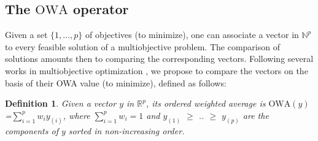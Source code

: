 \documentclass[final,3p,times]{elsarticle}
\newcommand{\owa}{\mbox{OWA}}
\newtheorem{defi}{Definition}
\begin{document}
\subsection{The $\owa$ operator}
\label{sec:def}

Given a set $\{1,\ldots,p\}$ of objectives (to minimize), one can associate a vector in ${\mathbb N}^p$ to every feasible solution of a multiobjective problem. The comparison of solutions amounts then to comparing the corresponding vectors. Following several works in multiobjective optimization \cite[e.g.][]{Ogryc00,PernS03,PerSS06}, we propose to compare the vectors on the basis of their OWA value \cite{Yager88} (to minimize), defined as follows:

\begin{defi}
Given a vector $y$ in ${\mathbb R}^p$, its ordered weighted average is $\owa(y)$=$\sum_{i=1}^p w_i y_{(i)}$, where $\sum_{i=1}^p w_i = 1$ and $y_{(1)}$ $\geq$ .. $\geq$ $y_{(p)}$ are the components of $y$ sorted in non-increasing order.
\end{defi}
\end{document}

